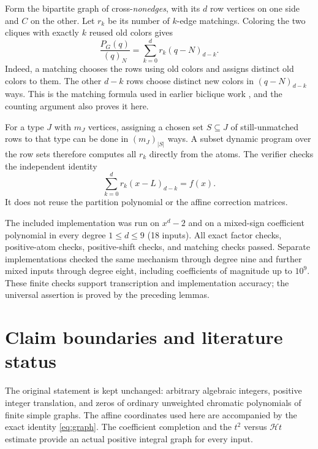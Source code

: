 \documentclass[11pt,a4paper]{article}
\theoremstyle{definition}
\newcommand{\fall}[2]{(#1)_{#2}}
\newcommand{\htf}{\mathcal H}
\begin{document}
Form the bipartite graph of cross-\emph{nonedges}, with its $d$ row
vertices on one side and $C$ on the other. Let $r_k$ be its number of
$k$-edge matchings. Coloring the two cliques with exactly $k$ reused
old colors gives
\begin{equation}\label{eq:rook}
 \frac{P_G(q)}{\fall qN}=\sum_{k=0}^d r_k\fall{q-N}{d-k}.
\end{equation}
Indeed, a matching chooses the rows using old colors and assigns
distinct old colors to them. The other $d-k$ rows choose distinct new
colors in $\fall{q-N}{d-k}$ ways. This is the matching formula used in
earlier biclique work \cite[Section 2.1]{Bohn}, and the counting argument
also proves it here.

For a type $J$ with $m_J$ vertices, assigning a chosen set $S\subseteq J$
of still-unmatched rows to that type can be done in
$\fall{m_J}{|S|}$ ways. A subset dynamic program over the row sets
therefore computes all $r_k$ directly from the atoms. The verifier
checks the independent identity
\begin{equation}\label{eq:rook-verify}
 \sum_{k=0}^d r_k\fall{x-L}{d-k}=f(x).
\end{equation}
It does not reuse the partition polynomial or the affine correction
matrices.

The included implementation was run on $x^d-2$ and on a mixed-sign
coefficient polynomial in every degree $1\le d\le9$ (18 inputs).
All exact factor checks, positive-atom checks, positive-shift checks,
and matching checks passed. Separate implementations checked the same
mechanism through degree nine and further mixed inputs through degree
eight, including coefficients of magnitude up to $10^9$.
These finite checks support transcription and implementation accuracy;
the universal assertion is proved by the preceding lemmas.

\section{Claim boundaries and literature status}\label{sec:status}

The original statement is kept unchanged: arbitrary algebraic integers,
positive integer translation, and zeros of ordinary unweighted chromatic
polynomials of finite simple graphs. The affine coordinates used here
are accompanied by the exact identity \eqref{eq:graph}. The coefficient
completion and the $t^2$ versus $\htf t$ estimate provide an actual
positive integral graph for every input.
\end{document}
